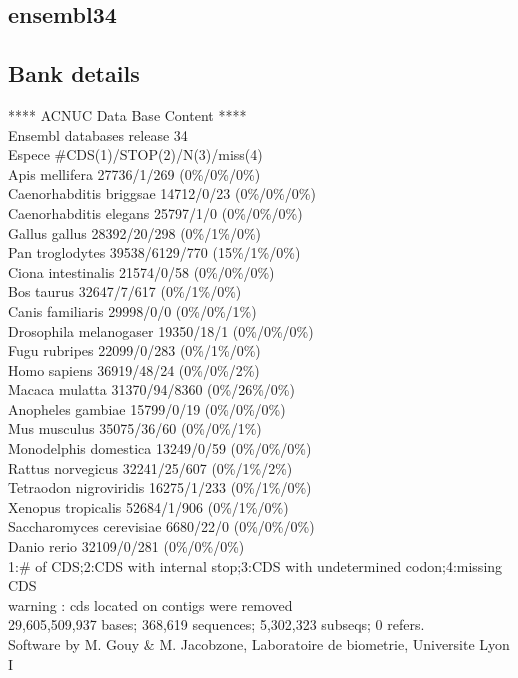 \documentclass{article}
\begin{document}
\begin{Schunk}
\section{ ensembl34 }
\subsection{Bank details}
            ****     ACNUC Data Base Content      ****   \\
                 Ensembl databases release 34        \\
Espece                                   \#CDS(1)/STOP(2)/N(3)/miss(4)\\
Apis mellifera                          27736/1/269 (0\%/0\%/0\%)\\
Caenorhabditis briggsae                 14712/0/23 (0\%/0\%/0\%)\\
Caenorhabditis elegans                  25797/1/0 (0\%/0\%/0\%)\\
Gallus gallus                           28392/20/298 (0\%/1\%/0\%)\\
Pan troglodytes                         39538/6129/770 (15\%/1\%/0\%)\\
Ciona intestinalis                      21574/0/58 (0\%/0\%/0\%)\\
Bos taurus                              32647/7/617 (0\%/1\%/0\%)\\
Canis familiaris                        29998/0/0 (0\%/0\%/1\%)\\
Drosophila melanogaser                  19350/18/1 (0\%/0\%/0\%)\\
Fugu rubripes                           22099/0/283 (0\%/1\%/0\%)\\
Homo sapiens                            36919/48/24 (0\%/0\%/2\%)\\
Macaca mulatta                          31370/94/8360 (0\%/26\%/0\%)\\
Anopheles gambiae                       15799/0/19 (0\%/0\%/0\%)\\
Mus musculus                            35075/36/60 (0\%/0\%/1\%)\\
Monodelphis domestica                   13249/0/59 (0\%/0\%/0\%)\\
Rattus norvegicus                       32241/25/607 (0\%/1\%/2\%)\\
Tetraodon nigroviridis                  16275/1/233 (0\%/1\%/0\%)\\
Xenopus tropicalis                      52684/1/906 (0\%/1\%/0\%)\\
Saccharomyces cerevisiae                6680/22/0 (0\%/0\%/0\%)\\
Danio rerio                             32109/0/281 (0\%/0\%/0\%)\\
1:\# of CDS;2:CDS with internal stop;3:CDS with undetermined codon;4:missing CDS\\
   warning : cds located on contigs were removed\\
29,605,509,937 bases; 368,619 sequences; 5,302,323 subseqs; 0 refers.\\
Software by M. Gouy \& M. Jacobzone, Laboratoire de biometrie, Universite Lyon I 


\end{Schunk}
\end{document}
